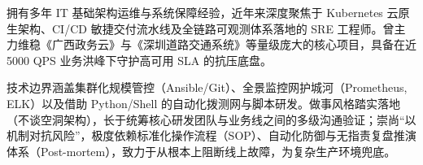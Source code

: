 

\begin{cvparagraph}

拥有多年 IT 基础架构运维与系统保障经验，近年来深度聚焦于 Kubernetes 云原生架构、CI/CD 敏捷交付流水线及全链路可观测体系落地的 SRE 工程师。曾主力维稳《广西政务云》与《深圳道路交通系统》等量级庞大的核心项目，具备在近 5000 QPS 业务洪峰下守护高可用 SLA 的抗压底盘。

技术边界涵盖集群化规模管控（Ansible/Git）、全景监控网护城河（Prometheus, ELK）以及借助 Python/Shell 的自动化拨测网与脚本研发。做事风格踏实落地（不谈空洞架构），长于统筹核心研发团队与业务线之间的多级沟通验证；崇尚“以机制对抗风险”，极度依赖标准化操作流程（SOP）、自动化防御与无指责复盘推演体系（Post-mortem），致力于从根本上阻断线上故障，为复杂生产环境兜底。
\end{cvparagraph}

